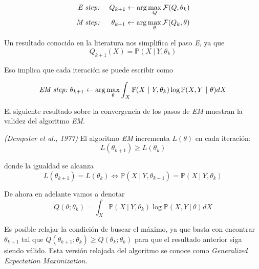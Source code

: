 \begin{eqnarray*}
	\emph{E\ step}\emph{:\ } &&Q_{k+1}\leftarrow \arg \max\limits_{Q}\mathcal{F}
	(Q,\theta _{k}) \\
	\emph{M\ step}\emph{:\ } &&\theta _{k+1}\leftarrow \arg \max\limits_{\theta }
	\mathcal{F}(Q_{k},\theta )
\end{eqnarray*}

Un resultado conocido en la literatura nos simplifica el paso \emph{E}, ya que
\begin{equation*}
Q_{k+1}(X)=\mathbb{P}(X\ |\ Y,\theta _{k})
\end{equation*}

Eso implica que cada iteración se puede escribir como

\begin{equation*}
\emph{EM\ step}\emph{:}\emph{\ }\theta _{k+1}\leftarrow \arg
\max\limits_{\theta }\int_{X}\mathbb{P}(X\ |\ Y,\theta _{k})\log \mathbb{P}%
(X,Y\ |\ \theta )dX
\end{equation*}

El siguiente resultado sobre la convergencia de los pasos de \emph{EM} muestran la validez del algoritmo \emph{EM}.

\begin{theorem}
	\emph{(Dempster et al., 1977)} El algoritmo \emph{EM} incrementa $L(\theta )$
	en cada iteración:
	\begin{equation*}
	L(\theta _{k+1})\geq L(\theta _{k})
	\end{equation*}
	
	donde la igualdad se alcanza
	\begin{equation*}
	L(\theta _{k+1})=L(\theta _{k})\Longleftrightarrow \mathbb{P}(X\ |\ Y,\theta
	_{k+1})=\mathbb{P}(X\ |\ Y,\theta _{k})
	\end{equation*}
\end{theorem}

\begin{definition}
	De ahora en adelante vamos a denotar
	\begin{equation*}
	Q(\theta ;\theta _{k})=\int_{X}\mathbb{P}(X\ |\ Y,\theta _{k})\log \mathbb{P}
	(X,Y\ |\ \theta )dX
	\end{equation*}
\end{definition}

Es posible relajar la condición de buscar el máximo, ya que basta con encontrar $\theta _{k+1}$ tal que $Q(\theta _{k+1};\theta _{k})\geq Q(\theta _{k};\theta _{k})$ para que el resultado anterior siga siendo válido$.$ Esta versión relajada del algoritmo se conoce como \emph{Generalized Expectation Maximization}.

